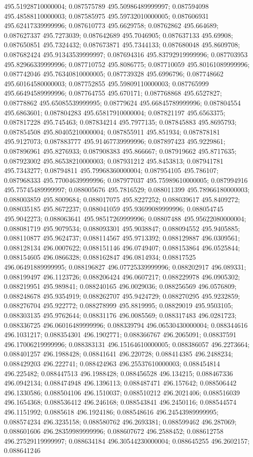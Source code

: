 495.51928710000004; 0.087575789 495.50986489999997; 0.087594098 495.48588110000003; 0.087585975 495.59732010000005; 0.087606931 495.62417339999996; 0.087610773 495.6629758; 0.08762862 495.664689; 0.087627337 495.7273039; 0.087642689 495.7046905; 0.087637133 495.69908; 0.087650851 495.7324432; 0.087673871 495.7344133; 0.087680048 495.8609708; 0.087682424 495.91343539999997; 0.087694316 495.83792919999996; 0.087703953 495.82966339999996; 0.087710752 495.8086775; 0.087710059 495.80161089999996; 0.087742046 495.76340810000005; 0.087739328 495.6996796; 0.087748662 495.60164580000003; 0.087752855 495.59809110000003; 0.087765999 495.66494589999996; 0.087764755 495.670171; 0.087768868 495.6527827; 0.08778862 495.65085539999995; 0.08779624 495.66845789999996; 0.087804554 495.6863601; 0.087804283 495.65817910000004; 0.087821197 495.6563375; 0.087817228 495.745463; 0.087834214 495.7977135; 0.087845883 495.8695793; 0.087854508 495.80405210000004; 0.087855911 495.851934; 0.087878181 495.9127073; 0.087883777 495.91467739999996; 0.087897423 495.9229861; 0.087896961 495.8276933; 0.087908383 495.866667; 0.087919662 495.8717635; 0.087923002 495.86538210000003; 0.087931212 495.8453813; 0.087941781 495.7343277; 0.08794811 495.79968360000004; 0.087954105 495.786107; 0.087968333 495.77004639999996; 0.087977037 495.75989610000005; 0.087994916 495.75745489999997; 0.088005676 495.7816529; 0.088011399 495.78966180000003; 0.088003859 495.8009684; 0.088017075 495.8227252; 0.088039617 495.8409272; 0.088035185 495.8672237; 0.088041059 495.93699089999996; 0.088054745 495.9042273; 0.088063641 495.98517269999996; 0.08807488 495.95622080000004; 0.088081719 495.9079534; 0.088093301 495.9038847; 0.088094552 495.9405885; 0.088110877 495.9624737; 0.088114567 495.9713392; 0.088129887 496.0309561; 0.088128134 496.0007622; 0.088151146 496.0749407; 0.088153864 496.0525844; 0.088154605 496.0866328; 0.088162847 496.0814934; 0.08817525 496.06491889999995; 0.088196827 496.07725339999996; 0.088202917 496.089331; 0.088199497 496.1123726; 0.088206424 496.0607217; 0.088229978 496.0905302; 0.088219951 495.989841; 0.088240165 496.0029036; 0.088256569 496.0576809; 0.088248678 495.9354919; 0.088262707 495.9424729; 0.088270295 495.9232859; 0.088276704 495.922772; 0.088278999 495.8819995; 0.08829019 495.9503105; 0.088303135 495.9762644; 0.08831176 496.0085569; 0.088317483 496.0281723; 0.088336725 496.06016489999996; 0.088339794 496.06530430000004; 0.088344616 496.1031217; 0.088354301 496.1902771; 0.088366767 496.2065091; 0.08837591 496.17006219999996; 0.088383131 496.15164610000005; 0.088386057 496.2273664; 0.088401257 496.1988428; 0.08841641 496.220728; 0.088414385 496.2488234; 0.088429203 496.222741; 0.088424963 496.25537610000003; 0.088454814 496.225482; 0.088447513 496.1988428; 0.088456528 496.134215; 0.088467336 496.0942134; 0.088474948 496.1396113; 0.088487471 496.157642; 0.088506442 496.1330586; 0.088504106 496.1510037; 0.088510212 496.2021406; 0.088516039 496.1654368; 0.088536412 496.246168; 0.088543841 496.2450116; 0.088544574 496.1151992; 0.0885618 496.1924186; 0.088548616 496.24543989999995; 0.088574234 496.3235158; 0.088580762 496.2693381; 0.088599462 496.287069; 0.088601606 496.28359989999996; 0.088607672 496.2588452; 0.088612758 496.27529119999997; 0.088634184 496.30544230000004; 0.088645255 496.2602157; 0.088641246 